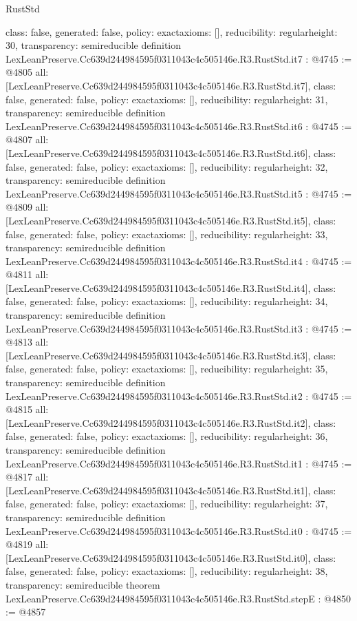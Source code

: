 \begin{lexlean}{RustStd}
\begin{coremodule}
{  class: false,
  generated: false,
  policy: exact{axioms: []},
  reducibility: regular{height: 30},
  transparency: semireducible
}
definition LexLeanPreserve.Cc639d244984595f0311043c4c505146e.R3.RustStd.it7 : @4745 := @4805 {
  all: [LexLeanPreserve.Cc639d244984595f0311043c4c505146e.R3.RustStd.it7],
  class: false,
  generated: false,
  policy: exact{axioms: []},
  reducibility: regular{height: 31},
  transparency: semireducible
}
definition LexLeanPreserve.Cc639d244984595f0311043c4c505146e.R3.RustStd.it6 : @4745 := @4807 {
  all: [LexLeanPreserve.Cc639d244984595f0311043c4c505146e.R3.RustStd.it6],
  class: false,
  generated: false,
  policy: exact{axioms: []},
  reducibility: regular{height: 32},
  transparency: semireducible
}
definition LexLeanPreserve.Cc639d244984595f0311043c4c505146e.R3.RustStd.it5 : @4745 := @4809 {
  all: [LexLeanPreserve.Cc639d244984595f0311043c4c505146e.R3.RustStd.it5],
  class: false,
  generated: false,
  policy: exact{axioms: []},
  reducibility: regular{height: 33},
  transparency: semireducible
}
definition LexLeanPreserve.Cc639d244984595f0311043c4c505146e.R3.RustStd.it4 : @4745 := @4811 {
  all: [LexLeanPreserve.Cc639d244984595f0311043c4c505146e.R3.RustStd.it4],
  class: false,
  generated: false,
  policy: exact{axioms: []},
  reducibility: regular{height: 34},
  transparency: semireducible
}
definition LexLeanPreserve.Cc639d244984595f0311043c4c505146e.R3.RustStd.it3 : @4745 := @4813 {
  all: [LexLeanPreserve.Cc639d244984595f0311043c4c505146e.R3.RustStd.it3],
  class: false,
  generated: false,
  policy: exact{axioms: []},
  reducibility: regular{height: 35},
  transparency: semireducible
}
definition LexLeanPreserve.Cc639d244984595f0311043c4c505146e.R3.RustStd.it2 : @4745 := @4815 {
  all: [LexLeanPreserve.Cc639d244984595f0311043c4c505146e.R3.RustStd.it2],
  class: false,
  generated: false,
  policy: exact{axioms: []},
  reducibility: regular{height: 36},
  transparency: semireducible
}
definition LexLeanPreserve.Cc639d244984595f0311043c4c505146e.R3.RustStd.it1 : @4745 := @4817 {
  all: [LexLeanPreserve.Cc639d244984595f0311043c4c505146e.R3.RustStd.it1],
  class: false,
  generated: false,
  policy: exact{axioms: []},
  reducibility: regular{height: 37},
  transparency: semireducible
}
definition LexLeanPreserve.Cc639d244984595f0311043c4c505146e.R3.RustStd.it0 : @4745 := @4819 {
  all: [LexLeanPreserve.Cc639d244984595f0311043c4c505146e.R3.RustStd.it0],
  class: false,
  generated: false,
  policy: exact{axioms: []},
  reducibility: regular{height: 38},
  transparency: semireducible
}
theorem LexLeanPreserve.Cc639d244984595f0311043c4c505146e.R3.RustStd.stepE : @4850 := @4857 {
}
\end{coremodule}
\end{lexlean}
